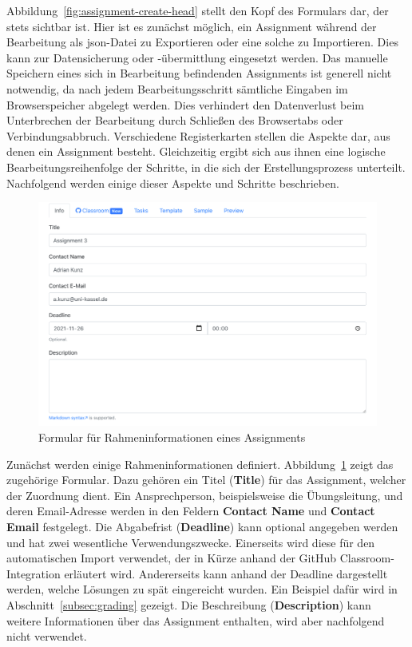 Abbildung~\ref{fig:assignment-create-head} stellt den Kopf des Formulars dar, der stets sichtbar ist.
Hier ist es zunächst möglich, ein Assignment während der Bearbeitung als \ac{json}-Datei zu Exportieren oder eine solche zu Importieren.
Dies kann zur Datensicherung oder -übermittlung eingesetzt werden.
Das manuelle Speichern eines sich in Bearbeitung befindenden Assignments ist generell nicht notwendig, da nach jedem Bearbeitungsschritt sämtliche Eingaben im Browserspeicher abgelegt werden.
Dies verhindert den Datenverlust beim Unterbrechen der Bearbeitung durch Schließen des Browsertabs oder Verbindungsabbruch.
Verschiedene Registerkarten stellen die Aspekte dar, aus denen ein Assignment besteht.
Gleichzeitig ergibt sich aus ihnen eine logische Bearbeitungsreihenfolge der Schritte, in die sich der Erstellungsprozess unterteilt.
Nachfolgend werden einige dieser Aspekte und Schritte beschrieben.

\begin{figure}
    \centering
    \includegraphics[width=\textwidth]{images/assignment-create-info}
    \caption{Formular für Rahmeninformationen eines Assignments}
    \label{fig:assignment-create-info}
\end{figure}

Zunächst werden einige Rahmeninformationen definiert.
Abbildung~\ref{fig:assignment-create-info} zeigt das zugehörige Formular.
Dazu gehören ein Titel (\textbf{Title}) für das Assignment, welcher der Zuordnung dient.
Ein Ansprechperson, beispielsweise die Übungsleitung, und deren Email-Adresse werden in den Feldern \textbf{Contact Name} und \textbf{Contact Email} festgelegt.
Die Abgabefrist (\textbf{Deadline}) kann optional angegeben werden und hat zwei wesentliche Verwendungszwecke.
Einerseits wird diese für den automatischen Import verwendet, der in Kürze anhand der GitHub Classroom-Integration erläutert wird.
Andererseits kann anhand der Deadline dargestellt werden, welche Lösungen zu spät eingereicht wurden.
Ein Beispiel dafür wird in Abschnitt~\ref{subsec:grading} gezeigt.
Die Beschreibung (\textbf{Description}) kann weitere Informationen über das Assignment enthalten, wird aber nachfolgend nicht verwendet.

